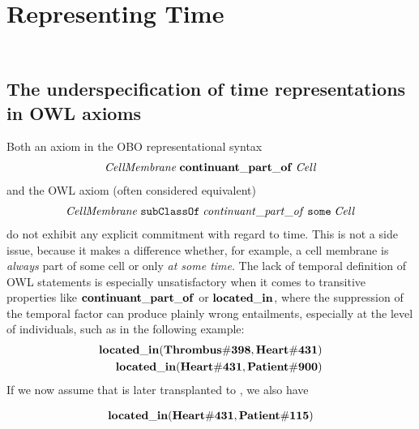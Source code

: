 \section*{Representing Time}


\subsection*{\\
The underspecification of time representations in OWL axioms}

Both an axiom in the OBO representational syntax  
%
\begin{equation}
\begin{split}
\mathit{CellMembrane}\;\mathrm{\mathbf{continuant\_part\_of}}\;\mathit{Cell}
\end{split}
\label{eq:cellobo}
\end{equation}
%
and the OWL axiom (often considered equivalent)
%
\begin{equation}
\begin{split}
\mathit{CellMembrane}\;\mathtt{subClassOf}\;\mathit{continuant\_part\_of}\;\mathtt{some}\;\mathit{Cell}
\end{split}
\label{eq:celldl}
\end{equation}
%
do not exhibit any explicit commitment with regard to time. This is not a side issue, because it makes a
difference whether, for example, a cell membrane is \emph{always} part of some cell or
only \emph{at some time}. 
The lack of temporal definition of OWL statements is especially unsatisfactory
when it comes to transitive properties like $\mathrm{\mathbf{continuant\_part\_of}}$ or $\mathrm{\mathbf{located\_in}}$,
where the suppression of the temporal factor can produce plainly wrong entailments,
especially at the level of individuals, such as in the following example:
%
\begin{equation}
\begin{split}
\mathrm{\mathbf{located\_in}} (\mathrm{\mathbf{Thrombus\#398}}, \mathrm{\mathbf{Heart\#431}})  \\
\mathrm{\mathbf{located\_in}} (\mathrm{\mathbf{Heart\#431}}, \mathrm{\mathbf{Patient\#900}})
\end{split}
\label{eq:trans}
\end{equation}
%
If we now assume that  is later transplanted to , we also have

\begin{equation}
\begin{split}
\mathrm{\mathbf{located\_in}} (\mathrm{\mathbf{Heart\#431}}, \mathrm{\mathbf{Patient\#115}})
\end{split}
\label{eq:trans}
\end{equation}

